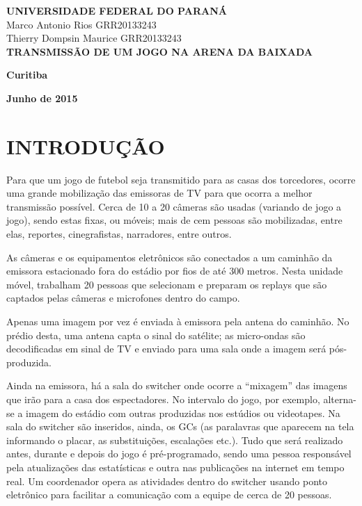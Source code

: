 \documentclass[a4paper,12pt]{article}
\begin{document}
  
\begin{titlepage}
 \vfill
  \begin{center}
   {\large \textbf{UNIVERSIDADE FEDERAL DO PARANÁ}} \\[5cm]

   {\large {Marco Antonio Rios  GRR20133243 \\ Thierry Dompsin Maurice GRR20133243 }}\\[5cm]


   {\Large \textbf{TRANSMISSÃO DE UM JOGO NA ARENA DA BAIXADA}}\\[4cm]
  \vfill

\vspace{2cm}

\large \textbf{Curitiba}

\large \textbf{Junho de 2015}
\end{center}
\end{titlepage}
  
  
  
  
  \thispagestyle{empty}
  \clearpage
  \setcounter{page}{1}
  \tableofcontents
  
  \clearpage
  
  \section{INTRODUÇÃO}
  
  Para que um jogo de futebol seja transmitido para as casas dos torcedores,
ocorre uma grande mobilização das emissoras de TV para que ocorra a melhor
transmissão possível. Cerca de 10 a 20 câmeras são usadas (variando de jogo a
jogo), sendo estas fixas, ou móveis; mais de cem pessoas são mobilizadas, entre
elas, reportes, cinegrafistas, narradores, entre outros.

As câmeras e os equipamentos eletrônicos são conectados a um caminhão
da emissora estacionado fora do estádio por fios de até 300 metros. Nesta unidade
móvel, trabalham 20 pessoas que selecionam e preparam os replays que são
captados pelas câmeras e microfones dentro do campo.

Apenas uma imagem por vez é enviada à emissora pela antena do caminhão.
No prédio desta, uma antena capta o sinal do satélite; as micro-ondas são
decodificadas em sinal de TV e enviado para uma sala onde a imagem será pós-produzida.

Ainda na emissora, há a sala do switcher onde ocorre a “mixagem” das
imagens que irão para a casa dos espectadores. No intervalo do jogo, por exemplo,
alterna-se a imagem do estádio com outras produzidas nos estúdios ou videotapes.
Na sala do switcher são inseridos, ainda, os GCs (as paralavras que aparecem na
tela informando o placar, as substituições, escalações etc.). Tudo que será realizado
antes, durante e depois do jogo é pré-programado, sendo uma pessoa responsável
pela atualizações das estatísticas e outra nas publicações na internet em tempo
real. Um coordenador opera as atividades dentro do switcher usando ponto
eletrônico para facilitar a comunicação com a equipe de cerca de 20 pessoas.
\end{document}
